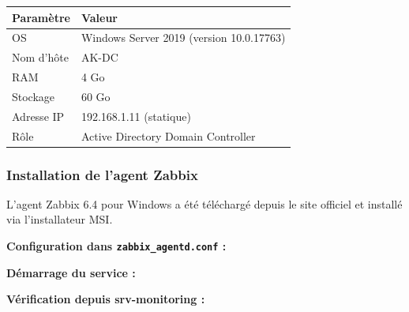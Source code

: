 {\def\LTcaptype{none} %
\begin{longtable}[]{@{}ll@{}}
\toprule\noalign{}
Paramètre & Valeur \\
\midrule\noalign{}
\endhead
\bottomrule\noalign{}
\endlastfoot
OS & Windows Server 2019 (version 10.0.17763) \\
Nom d'hôte & AK-DC \\
RAM & 4 Go \\
Stockage & 60 Go \\
Adresse IP & 192.168.1.11 (statique) \\
Rôle & Active Directory Domain Controller \\
\end{longtable}
}

\subsubsection{Installation de l'agent
Zabbix}\label{installation-de-lagent-zabbix-1}

L'agent Zabbix 6.4 pour Windows a été téléchargé depuis le site officiel
et installé via l'installateur MSI.

\textbf{Configuration dans \texttt{zabbix\_agentd.conf} :}

\begin{Shaded}
\begin{Highlighting}[]
\OtherTok{=}
\OtherTok{=}
\OtherTok{=}
\end{Highlighting}
\end{Shaded}

\textbf{Démarrage du service :}

\begin{Shaded}
\begin{Highlighting}[]
 
 \OperatorTok{{-}}
\end{Highlighting}
\end{Shaded}

\textbf{Vérification depuis srv-monitoring :}

\begin{Shaded}
\begin{Highlighting}[]
 

 

 
\end{Highlighting}
\end{Shaded}

